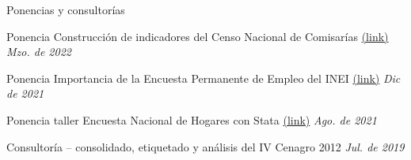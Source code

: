 \documentclass[
	11pt, %
]{resume} %
\begin{document}
\begin{rSection}{Ponencias y consultorías}
	
\item Ponencia Construcción de indicadores del Censo Nacional de Comisarías  
 \href{https://bit.ly/3JgRMjN}{(link)} \hfill \textit{Mzo. de 2022}  
\item Ponencia Importancia de la Encuesta Permanente de Empleo del INEI \href{https://bit.ly/3ISHYuX}{(link)}  \hfill \textit{Dic de 2021} 
\item Ponencia taller Encuesta Nacional de Hogares con Stata \href{https://bit.ly/3mpje65}{(link)} \hfill \textit{Ago. de 2021} 
\item Consultoría – consolidado, etiquetado y análisis del IV Cenagro 2012 \hfill \textit{Jul. de 2019} 

	\end{rSection}




\end{document}
